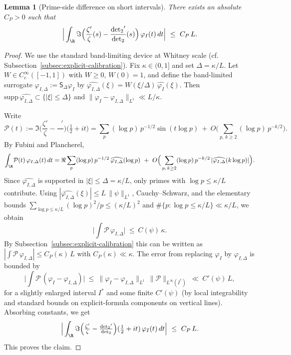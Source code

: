 \documentclass[11pt]{article}
\newtheorem{lemma}[theorem]{Lemma}
\theoremstyle{remark}
\DeclareMathOperator{\dettwo}{det_2}
\begin{document}
\begin{lemma}[Prime-side difference on short intervals]\label{lem:prime-short}
There exists an absolute \(C_P>0\) such that
\[ \Big|\int_{\R} \Im\Big(\frac{\zeta'}{\zeta}(s)-\frac{\dettwo'}{\dettwo}(s)\Big)\,\varphi_I(t)\,dt\Big|\ \le\ C_P\,L.\]
\end{lemma}
\begin{proof}
We use the standard band-limiting device at Whitney scale (cf. Subsection~\ref{subsec:explicit-calibration}). Fix \(\kappa\in(0,1] \) and set \(\Delta=\kappa/L\). Let \(W\in C_c^\infty([-1,1])\) with \(W\ge 0\), \(W(0)=1\), and define the band-limited surrogate \(\varphi_{I,\Delta}:=\mathsf S_\Delta\varphi_I\) by \(\widehat{\varphi_{I,\Delta}}(\xi)=W(\xi/\Delta)\,\widehat{\varphi_I}(\xi)\). Then \(\mathrm{supp}\,\widehat{\varphi_{I,\Delta}}\subset\{|
\xi|\le \Delta\}\) and \(\|\varphi_{I}-\varphi_{I,\Delta}\|_{L^1}\ll L/\kappa\).

Write
\[
 \mathcal P(t):=\Im\Big(\frac{\zeta'}{\zeta}-\frac{\dettwo'}{\dettwo}\Big)\!\Big(\tfrac12+it\Big)
 = \sum_{p}(\log p)\,p^{-1/2}\sin(t\log p)\ +\ O\Big(\sum_{p,\,k\ge 2}(\log p)\,p^{-k/2}\Big).
\]
By Fubini and Plancherel,
\[
 \int_{\R}\!\mathcal P(t)\,\varphi_{I,\Delta}(t)\,dt
 = \Re\sum_{p}(\log p)\,p^{-1/2}\,\widehat{\varphi_{I,\Delta}}(\log p)\ +\ O\Big(\sum_{p,\,k\ge 2}(\log p)\,p^{-k/2}\,|\widehat{\varphi_{I,\Delta}}(k\log p)|\Big).
\]
Since \(\widehat{\varphi_{I,\Delta}}\) is supported in \(|\xi|\le \Delta=\kappa/L\), only primes with \(\log p\le \kappa/L\) contribute. Using \(|\widehat{\varphi_{I,\Delta}}(\xi)|\le L\,\|\psi\|_{L^1}\), Cauchy--Schwarz, and the elementary bounds
\(\sum_{\log p\le \kappa/L}(\log p)^2/p\le (\kappa/L)^2\) and \(\#\{p: \log p\le \kappa/L\}\ll \kappa/L\), we obtain
\[
 \Big|\int \mathcal P\,\varphi_{I,\Delta}\Big|\ \le\ C(\psi)\,\kappa.
\]
By Subsection~\ref{subsec:explicit-calibration} this can be written as \(|\int \mathcal P\,\varphi_{I,\Delta}|\le C_P(\kappa)\,L\) with \(C_P(\kappa)\ll \kappa\). The error from replacing \(\varphi_I\) by \(\varphi_{I,\Delta}\) is bounded by
\[
 \Big|\int \mathcal P\,(\varphi_I-\varphi_{I,\Delta})\Big|\ \le\ \|\varphi_I-\varphi_{I,\Delta}\|_{L^1}\,\Big\|\mathcal P\Big\|_{L^\infty(I^*)}
 \ \ll\ C'(\psi)\,L,
\]
for a slightly enlarged interval \(I^*\) and some finite \(C'(\psi)\) (by local integrability and standard bounds on explicit-formula components on vertical lines). Absorbing constants, we get
\[
 \Big|\int_{\R} \Im\Big(\tfrac{\zeta'}{\zeta}-\tfrac{\dettwo'}{\dettwo}\Big)(\tfrac12+it)\,\varphi_I(t)\,dt\Big|\ \le\ C_P\,L.
\]
This proves the claim.\qedhere
\end{proof}
\end{document}
